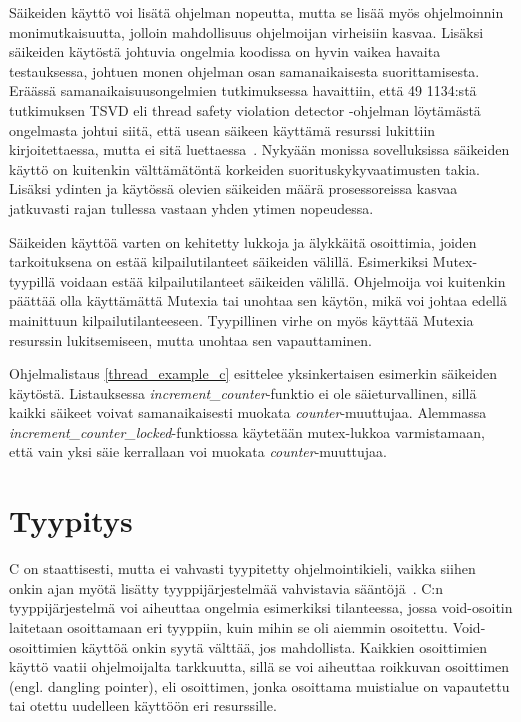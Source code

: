 Säikeiden käyttö voi lisätä ohjelman nopeutta, mutta se lisää myös ohjelmoinnin monimutkaisuutta, jolloin mahdollisuus ohjelmoijan virheisiin kasvaa. Lisäksi säikeiden käytöstä johtuvia ongelmia koodissa on hyvin vaikea havaita testauksessa, johtuen monen ohjelman osan samanaikaisesta suorittamisesta. Eräässä samanaikaisuusongelmien tutkimuksessa havaittiin, että 49\text{\%} 1134:stä tutkimuksen TSVD eli thread safety violation detector -ohjelman löytämästä ongelmasta johtui siitä, että usean säikeen käyttämä resurssi lukittiin kirjoitettaessa, mutta ei sitä luettaessa~\cite[p.~172]{10.1145/3341301.3359638}. Nykyään monissa sovelluksissa säikeiden käyttö on kuitenkin välttämätöntä korkeiden suorituskykyvaatimusten takia. Lisäksi ydinten ja käytössä olevien säikeiden määrä prosessoreissa kasvaa jatkuvasti rajan tullessa vastaan yhden ytimen nopeudessa.

Säikeiden käyttöä varten on kehitetty lukkoja ja älykkäitä osoittimia, joiden tarkoituksena on estää kilpailutilanteet säikeiden välillä. Esimerkiksi Mutex-tyypillä voidaan estää kilpailutilanteet säikeiden välillä. Ohjelmoija voi kuitenkin päättää olla käyttämättä Mutexia tai unohtaa sen käytön, mikä voi johtaa edellä mainittuun kilpailutilanteeseen. Tyypillinen virhe on myös käyttää Mutexia resurssin lukitsemiseen, mutta unohtaa sen vapauttaminen. 

Ohjelmalistaus \ref{thread_example_c} esittelee yksinkertaisen esimerkin säikeiden käytöstä. Listauksessa \textit{increment\_counter}-funktio ei ole säieturvallinen, sillä kaikki säikeet voivat samanaikaisesti muokata \textit{counter}-muuttujaa. Alemmassa \textit{increment\_counter\_locked}-funktiossa käytetään mutex-lukkoa varmistamaan, että vain yksi säie kerrallaan voi muokata \textit{counter}-muuttujaa.

\begin{minipage}{\linewidth}

\end{minipage}

\section{Tyypitys}
C on staattisesti, mutta ei vahvasti tyypitetty ohjelmointikieli, vaikka siihen onkin ajan myötä lisätty tyyppijärjestelmää vahvistavia sääntöjä~\cite[p.~3]{Cbook}. C:n tyyppijärjestelmä voi aiheuttaa ongelmia esimerkiksi tilanteessa, jossa void-osoitin laitetaan osoittamaan eri tyyppiin, kuin mihin se oli aiemmin osoitettu. Void-osoittimien käyttöä onkin syytä välttää, jos mahdollista. Kaikkien osoittimien käyttö vaatii ohjelmoijalta tarkkuutta, sillä se voi aiheuttaa roikkuvan osoittimen (engl. dangling pointer), eli osoittimen, jonka osoittama muistialue on vapautettu tai otettu uudelleen käyttöön eri resurssille. 

